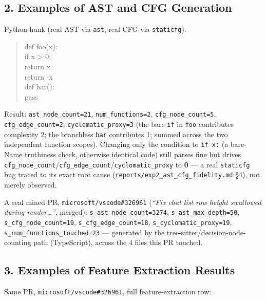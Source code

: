 \documentclass{experimentreport}
\begin{document}
{\subsection*{2. Examples of AST and CFG Generation}

Python hunk (real AST via \texttt{ast}, real CFG via \texttt{staticfg}):

\begin{quote}
\ttfamily
\noindent
def foo(x):\\
\hspace*{2em}if x > 0:\\
\hspace*{4em}return x\\
\hspace*{2em}return -x\\[0.4em]
def bar():\\
\hspace*{2em}pass
\end{quote}

Result: \texttt{ast\_node\_count=21}, \texttt{num\_functions=2},
\texttt{cfg\_node\_count=5}, \texttt{cfg\_edge\_count=2}, \texttt{cyclomatic\_proxy=3} (the bare
\texttt{if} in \texttt{foo} contributes complexity 2; the branchless \texttt{bar} contributes 1;
summed across the two independent function scopes). Changing only the condition to \texttt{if x:}
(a bare-Name truthiness check, otherwise identical code) still parses fine but drives
\texttt{cfg\_node\_count}/\allowbreak\texttt{cfg\_edge\_count}/\allowbreak\texttt{cyclomatic\_proxy} to \textbf{0} --- a
real \texttt{staticfg} bug traced to its exact root cause (\texttt{reports/exp2\_ast\_cfg\_fidelity.md}
\S4), not merely observed.

A real mined PR, \texttt{microsoft/vscode\#326961} (\emph{``Fix chat list row height swallowed
during render\ldots''}, merged): \texttt{s\_ast\_node\_count=3274}, \texttt{s\_ast\_max\_depth=50},
\texttt{s\_cfg\_node\_count=19}, \texttt{s\_cfg\_edge\_count=18}, \texttt{s\_cyclomatic\_proxy=19},
\texttt{s\_num\_functions\_touched=23} --- generated by the tree-sitter/decision-node-counting path
(TypeScript), across the 4 files this PR touched.

\subsection*{3. Examples of Feature Extraction Results}

Same PR, \texttt{microsoft/vscode\#326961}, full feature-extraction row:

}
\end{document}
